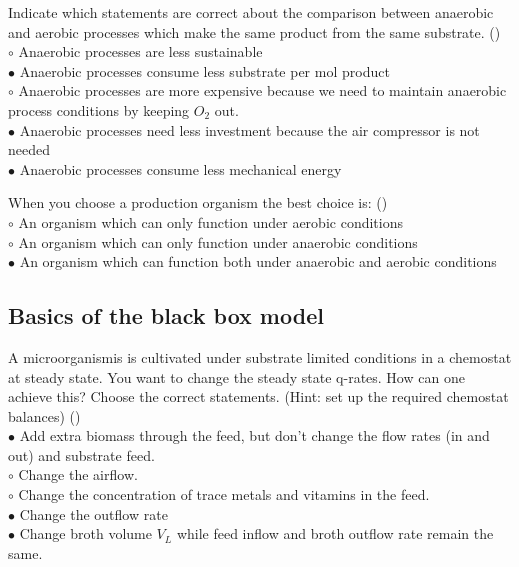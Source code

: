 \documentclass[]{beamer}
\begin{document}
\begin{frame}[shrink] {} 
\color{blue}
    Indicate which statements are correct about the comparison between anaerobic and aerobic processes which make the same product from the same substrate.
 ({\color{green}{Q4b}})\\
\color{black}
\setlength{\parindent}{-0.4cm}
{\color{red}$\circ$} Anaerobic processes are less sustainable  \\
{\color{red}$\bullet$} Anaerobic processes consume less substrate per mol product  \\
{\color{red}$\circ$} Anaerobic processes are more expensive because we need to maintain anaerobic process conditions by keeping $O_{2}$ out.  \\
{\color{red}$\bullet$} Anaerobic processes need less investment because the air compressor is not needed  \\
{\color{red}$\bullet$} Anaerobic processes consume less mechanical energy  \\
\end{frame}


\begin{frame}[shrink] {} 
\color{blue}
    When you choose a production organism the best choice is:
 ({\color{green}{Q4c}})\\
\color{black}
\setlength{\parindent}{-0.4cm}
{\color{red}$\circ$} An organism which can only function under aerobic conditions  \\
{\color{red}$\circ$} An organism which can only function under anaerobic conditions  \\
{\color{red}$\bullet$} An organism which can function both under anaerobic and aerobic conditions  \\
\end{frame}


\subsection{Basics of the black box model}
\begin{frame}[shrink] {} 
\color{blue}
A microorganismis is cultivated under substrate limited conditions in a chemostat at steady state. You want to change the steady state q-rates. How can one achieve this? Choose the correct statements. (Hint: set up the required chemostat balances) ({\color{green}{Q1}})\\
\color{black}
\setlength{\parindent}{-0.4cm}
{\color{red}$\bullet$}  Add extra biomass through the feed, but don’t change the flow rates (in and out) and substrate feed. \\
{\color{red}$\circ$}  Change the airflow. \\
{\color{red}$\circ$}  Change the concentration of trace metals and vitamins in the feed. \\
{\color{red}$\bullet$}  Change the outflow rate \\
{\color{red}$\bullet$}  Change broth volume $V_{L}$ while feed inflow and broth outflow rate remain the same. \\
\end{frame}
\end{document}
